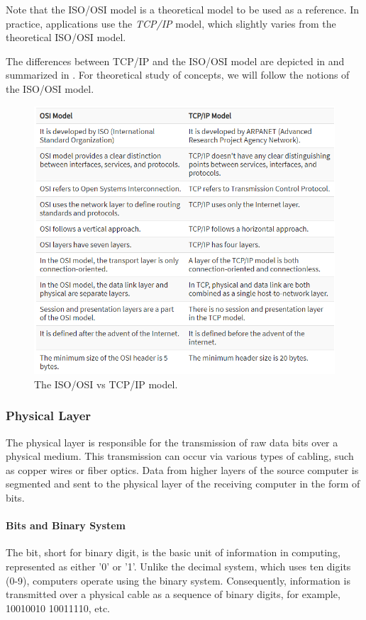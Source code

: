 Note that the ISO/OSI model is a theoretical model to be used as a reference. In practice, applications use the \textit{TCP/IP} model, which slightly varies from the theoretical ISO/OSI model.

The differences between TCP/IP and the ISO/OSI model are depicted in  and summarized in . For theoretical study of concepts, we will follow the notions of the ISO/OSI model.

\begin{figure}[h!]
    \centering
    \includegraphics[width=\textwidth]{images/tcp_vs_osi.png}
    \caption{The ISO/OSI vs TCP/IP model.}
    \label{fig:tcp_vs_osi}
\end{figure}


\subsubsection{\textbf{Physical Layer}}
The physical layer is responsible for the transmission of raw data bits over a physical medium. This transmission can occur via various types of cabling, such as copper wires or fiber optics. Data from higher layers of the source computer is segmented and sent to the physical layer of the receiving computer in the form of bits.

\paragraph{Bits and Binary System}
The bit, short for binary digit, is the basic unit of information in computing, represented as either '0' or '1'. Unlike the decimal system, which uses ten digits (0-9), computers operate using the binary system. Consequently, information is transmitted over a physical cable as a sequence of binary digits, for example, 10010010 10011110, etc.

